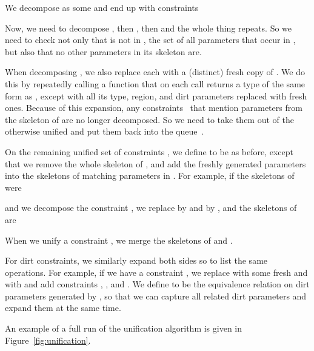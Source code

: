 \documentclass{LMCS}
\begin{document}
We decompose  as some  and end up with constraints

Now, we need to decompose , then , then  and the whole thing repeats.
So we need to check not only that  is not in ,
the set of all parameters that occur in ,
but also that no other parameters in its skeleton are.

When decomposing ,
we also replace each  with a (distinct) fresh copy of .
We do this by repeatedly calling a function  that on each call returns a type of the same form as ,
except with all its type, region, and dirt parameters replaced with fresh ones.
Because of this expansion, any constraints~
that mention parameters from the skeleton of  are no longer decomposed.
So we need to take them out of the otherwise unified  and put them back into the queue~.

On the remaining unified set of constraints ,
we define  to be as before,
except that we remove the whole skeleton of ,
and add the freshly generated parameters into the skeletons of matching parameters in .
For example, if the skeletons of  were

and we decompose the constraint ,
we replace  by  and  by ,
and the skeletons of  are

When we unify a constraint , we merge the skeletons of  and .

For dirt constraints,
we similarly expand both sides so to list the same operations.
For example, if we have a constraint
,
we replace  with some fresh 
and  with 
and add constraints , , and .
We define  to be the equivalence relation on dirt parameters generated by ,
so that we can capture all related dirt parameters and expand them at the same time.

An example of a full run of the unification algorithm is given in Figure~\ref{fig:unification}.
\end{document}
